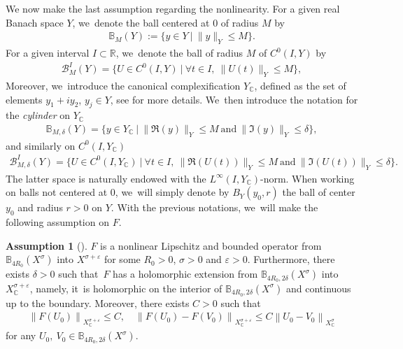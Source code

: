 \documentclass[JEP,XML,SOM,Unicode,published]{cedram}
\theoremstyle{definition}
\newtheorem{assum}{Assumption}
\newenvironment{assump}[2][]
{\renewcommand\theassum{#2}\begin{assum}[#1]}
{\end{assum}}
\let\mc\mathcal
\let\veps\varepsilon
\newcommand{\B}{\mc{B}}
\newcommand{\R}{\mathbb{R}}
\providecommand{\norm}[1]{\lVert#1\rVert}
\newcommand\nor[2]{\left\|#1\right\|_{#2}}
\begin{document}
We now make the last assumption regarding the nonlinearity. For a given real Banach space $Y$, we~denote the ball centered at $0$ of radius $M$ by
\begin{align*}
\mathbb{B}_M(Y):=\{y\in Y\ |\ \norm{y}_Y\leq M\}.
\end{align*}
For a given interval $I\subset \R$, we~denote the ball of radius $M$ of $C^0(I, Y)$ by
\begin{align*}
\B_{M}^I(Y)=\{U\in C^0(I, Y)\ |\ \forall t\in I,\ \norm{U(t)}_Y\leq M\},
\end{align*}
Moreover, we~introduce the canonical complexification $Y_\mathbb{C}$, defined as the set of elements $y_1+iy_2$, $y_j\in Y$, see \cite[\S 2]{BS:71-polynomials} for more details. We~then introduce the notation for the \emph{cylinder} on $Y_\mathbb{C}$
\begin{align*}
\mathbb{B}_{M, \delta}(Y)=\{y\in Y_\mathbb{C}\ |\ \norm{\Re(y)}_Y\leq M\ \text{and}\ \norm{\Im(y)}_Y\leq \delta\},
\end{align*}
and similarly on $C^0(I, Y_\mathbb{C})$
\begin{align*}
\B_{M, \delta}^I(Y)=\{U\in C^0(I, Y_\mathbb{C})\ |\ \forall t\in I,\ \norm{\Re(U(t))}_Y\leq M\ \text{and}\ \norm{\Im(U(t))}_Y\leq \delta\}.
\end{align*}
The latter space is naturally endowed with the $L^\infty(I,Y_\mathbb{C})$-norm. When working on balls not centered at $0$, we~will simply denote by $B_Y(y_0, r)$ the ball of center $y_0$ and radius $r>0$ on $Y$. With the previous notations, we~will make the following assumption on $F$.
\begin{assump}{3}
\label{assumFholom}
$F$ is a nonlinear Lipschitz and bounded operator from $\mathbb{B}_{4R_{0}}(X^{\sigma})$ into $X^{\sigma+\veps}$ for some $R_{0}>0$, $\sigma>0$ and $\veps>0$. Furthermore, there exists $\delta>0$ such that~$F$ has a holomorphic extension from $\mathbb{B}_{4R_{0},2\delta}(X^{\sigma})$ into $X^{\sigma+\veps}_{\mathbb{C}}$, namely, it~is holomorphic on the interior of $\mathbb{B}_{4R_{0},2\delta}(X^{\sigma})$ and continuous up to the boundary. Moreover, there exists $C>0$ such that
\begin{align}
\label{boundFanalyticintro}
\nor{F(U_{0})}{X^{\sigma+\veps}_{\mathbb{C}}}\leq C,\quad \nor{F(U_{0})-F(V_{0})}{X^{\sigma+\veps}_{\mathbb{C}}}\leq C \nor{U_{0}-V_{0}}{X^{\sigma}_{\mathbb{C}}}
\end{align}
for any $U_{0},~V_{0}\in \mathbb{B}_{4R_{0},2\delta}(X^{\sigma})$.
\end{assump}
\end{document}
